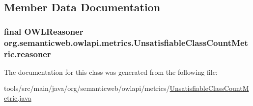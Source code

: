 \subsection{Member Data Documentation}
\hypertarget{classorg_1_1semanticweb_1_1owlapi_1_1metrics_1_1_unsatisfiable_class_count_metric_a22b41c912834349275f2b2b66ee4b189}{
\subsubsection[{reasoner}]{\setlength{\rightskip}{0pt plus 5cm}final {\bf O\-W\-L\-Reasoner} org.\-semanticweb.\-owlapi.\-metrics.\-Unsatisfiable\-Class\-Count\-Metric.\-reasoner\hspace{0.3cm}{\ttfamily [private]}}}\label{classorg_1_1semanticweb_1_1owlapi_1_1metrics_1_1_unsatisfiable_class_count_metric_a22b41c912834349275f2b2b66ee4b189}


The documentation for this class was generated from the following file\-:\begin{DoxyCompactItemize}
\item 
tools/src/main/java/org/semanticweb/owlapi/metrics/\hyperlink{_unsatisfiable_class_count_metric_8java}{Unsatisfiable\-Class\-Count\-Metric.\-java}\end{DoxyCompactItemize}
